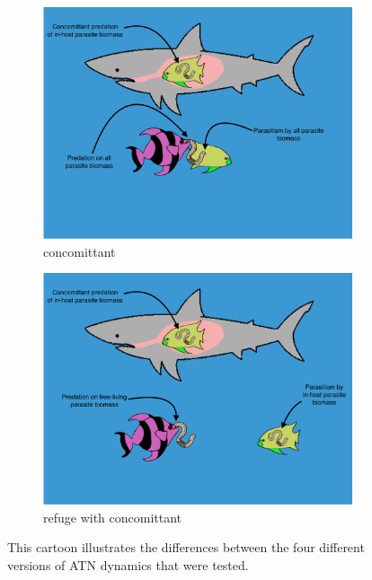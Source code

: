 \documentclass[11pt]{amsart}
\begin{document}
\begin{figure}
\begin{subfigure}{.45\textwidth}
\caption{concomittant\label{subfig:modelsC}}
\includegraphics[width=\textwidth]{../figures/Null+Con.png}
\end{subfigure}
\begin{subfigure}{.45\textwidth}
\caption{refuge with concomittant\label{subfig:modelsD}}
\includegraphics[width=\textwidth]{../figures/Con+Ref.png}
\end{subfigure}
\caption{This cartoon illustrates the differences between the four different versions of ATN dynamics that were tested.  \label{fig:cartoons}}
\end{figure}
\end{document}
